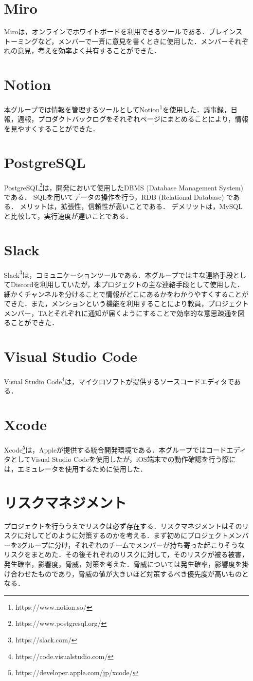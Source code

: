 \section{Miro}
Miroは，オンラインでホワイトボードを利用できるツールである．ブレインストーミングなど，メンバーで一斉に意見を書くときに使用した．メンバーそれぞれの意見，考えを効率よく共有することができた．

\section{Notion}
本グループでは情報を管理するツールとしてNotion\footnote{https://www.notion.so/}を使用した．議事録，日報，週報，プロダクトバックログをそれぞれページにまとめることにより，情報を見やすくすることができた．

\section{PostgreSQL}
PostgreSQL\footnote{https://www.postgresql.org/}は，開発において使用したDBMS (Database Management System) である．
SQLを用いてデータの操作を行う，RDB (Relational Database) である．
メリットは，拡張性，信頼性が高いことである．
デメリットは，MySQLと比較して，実行速度が遅いことである．

\section{Slack}
Slack\footnote{https://slack.com/}は，コミュニケーションツールである．本グループでは主な連絡手段としてDiscordを利用していたが，本プロジェクトの主な連絡手段として使用した．細かくチャンネルを分けることで情報がどこにあるかをわかりやすくすることができた．また，メンションという機能を利用することにより教員，プロジェクトメンバー，TAとそれぞれに通知が届くようにすることで効率的な意思疎通を図ることができた．

\section{Visual Studio Code}
Visual Studio Code\footnote{https://code.visualstudio.com/}は，マイクロソフトが提供するソースコードエディタである．

\section{Xcode}
Xcode\footnote{https://developer.apple.com/jp/xcode/}は，Appleが提供する統合開発環境である．本グループではコードエディタとしてVisual Studio Codeを使用したが，iOS端末での動作確認を行う際には，エミュレータを使用するために使用した．


\section{リスクマネジメント}
プロジェクトを行ううえでリスクは必ず存在する．リスクマネジメント\cite{risk}はそのリスクに対してどのように対策するのかを考える．まず初めにプロジェクトメンバーを3グループに分け，それぞれのチームでメンバーが持ち寄った起こりそうなリスクをまとめた．その後それぞれのリスクに対して，そのリスクが被る被害，発生確率，影響度，脅威，対策を考えた．脅威については発生確率，影響度を掛け合わせたものであり，脅威の値が大きいほど対策するべき優先度が高いものとなる．

